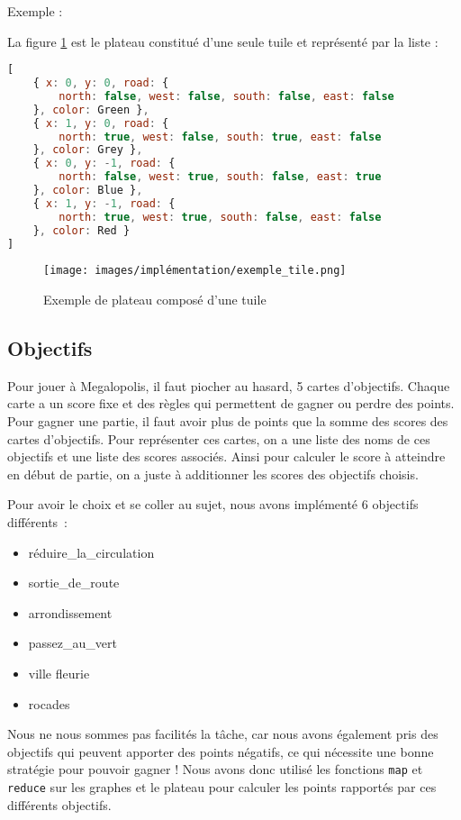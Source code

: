 Exemple :

La figure \ref{fig:board_tile} est le plateau constitué d'une seule tuile et représenté par la liste :\\
\begin{lstlisting}[language=JavaScript]
[
    { x: 0, y: 0, road: {
        north: false, west: false, south: false, east: false
    }, color: Green },
    { x: 1, y: 0, road: {
        north: true, west: false, south: true, east: false
    }, color: Grey },
    { x: 0, y: -1, road: {
        north: false, west: true, south: false, east: true
    }, color: Blue },
    { x: 1, y: -1, road: {
        north: true, west: true, south: false, east: false
    }, color: Red }
]
\end{lstlisting}

\begin{figure}[h]
    \centering
    \texttt{[image: images/implémentation/exemple\_tile.png]}
    \caption{Exemple de plateau composé d'une tuile}
    \label{fig:board_tile}
\end{figure}




\subsection{Objectifs}
\label{section:objectifs}
Pour jouer à Megalopolis, il faut piocher au hasard, 5 cartes d'objectifs. Chaque carte a un score fixe et des règles qui permettent de gagner ou perdre des points. Pour gagner une partie, il faut avoir plus de points que la somme des scores des cartes d'objectifs. Pour représenter ces cartes, on a une liste des noms de ces objectifs et une liste des scores associés. Ainsi pour calculer le score à atteindre en début de partie, on a juste à additionner les scores des objectifs choisis. 

Pour avoir le choix et se coller au sujet, nous avons implémenté 6 objectifs différents~: 
\begin{itemize}
    \item réduire\_la\_circulation
    \item sortie\_de\_route
    \item arrondissement
    \item passez\_au\_vert
    \item ville fleurie
    \item rocades
\end{itemize}

Nous ne nous sommes pas facilités la tâche, car nous avons également pris des objectifs qui peuvent apporter des points négatifs, ce qui nécessite une bonne stratégie pour pouvoir gagner ! Nous avons donc utilisé les fonctions \texttt{map} et \texttt{reduce} sur les graphes et le plateau pour calculer les points rapportés par ces différents objectifs.

